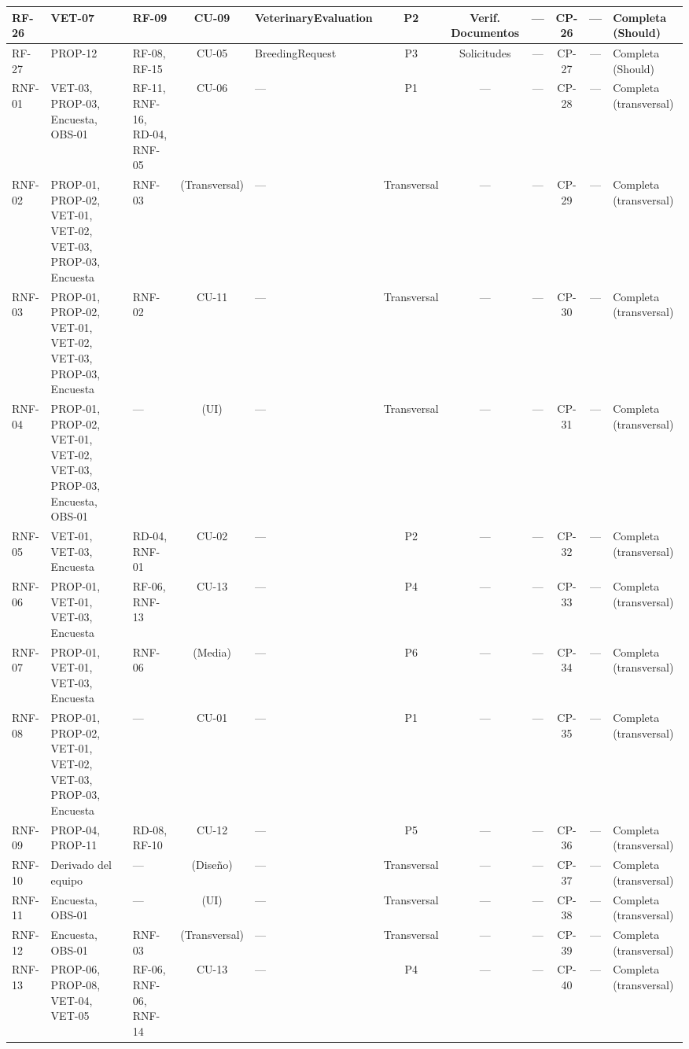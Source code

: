 \documentclass[journal,onecolumn]{IEEEtran}
\begin{document}
\begin{landscape}
\begin{table}[H]
\begin{tabularx}{\linewidth}{|l|X|X|c|X|c|c|c|c|c|X|}
				RF-26 & VET-07 & RF-09 & CU-09 & VeterinaryEvaluation & P2 & Verif. Documentos & --- & CP-26 & --- & Completa (Should) \\ \hline
				RF-27 & PROP-12 & RF-08, RF-15 & CU-05 & BreedingRequest & P3 & Solicitudes & --- & CP-27 & --- & Completa (Should) \\ \hline
				RNF-01 & VET-03, PROP-03, Encuesta, OBS-01 & RF-11, RNF-16, RD-04, RNF-05 & CU-06 & --- & P1 & --- & --- & CP-28 & --- & Completa (transversal) \\ \hline
				RNF-02 & PROP-01, PROP-02, VET-01, VET-02, VET-03, PROP-03, Encuesta & RNF-03 & (Transversal) & --- & Transversal & --- & --- & CP-29 & --- & Completa (transversal) \\ \hline
				RNF-03 & PROP-01, PROP-02, VET-01, VET-02, VET-03, PROP-03, Encuesta & RNF-02 & CU-11 & --- & Transversal & --- & --- & CP-30 & --- & Completa (transversal) \\ \hline
				RNF-04 & PROP-01, PROP-02, VET-01, VET-02, VET-03, PROP-03, Encuesta, OBS-01 & --- & (UI) & --- & Transversal & --- & --- & CP-31 & --- & Completa (transversal) \\ \hline
				RNF-05 & VET-01, VET-03, Encuesta & RD-04, RNF-01 & CU-02 & --- & P2 & --- & --- & CP-32 & --- & Completa (transversal) \\ \hline
				RNF-06 & PROP-01, VET-01, VET-03, Encuesta & RF-06, RNF-13 & CU-13 & --- & P4 & --- & --- & CP-33 & --- & Completa (transversal) \\ \hline
				RNF-07 & PROP-01, VET-01, VET-03, Encuesta & RNF-06 & (Media) & --- & P6 & --- & --- & CP-34 & --- & Completa (transversal) \\ \hline
				RNF-08 & PROP-01, PROP-02, VET-01, VET-02, VET-03, PROP-03, Encuesta & --- & CU-01 & --- & P1 & --- & --- & CP-35 & --- & Completa (transversal) \\ \hline
				RNF-09 & PROP-04, PROP-11 & RD-08, RF-10 & CU-12 & --- & P5 & --- & --- & CP-36 & --- & Completa (transversal) \\ \hline
				RNF-10 & Derivado del equipo & --- & (Diseño) & --- & Transversal & --- & --- & CP-37 & --- & Completa (transversal) \\ \hline
				RNF-11 & Encuesta, OBS-01 & --- & (UI) & --- & Transversal & --- & --- & CP-38 & --- & Completa (transversal) \\ \hline
				RNF-12 & Encuesta, OBS-01 & RNF-03 & (Transversal) & --- & Transversal & --- & --- & CP-39 & --- & Completa (transversal) \\ \hline
				RNF-13 & PROP-06, PROP-08, VET-04, VET-05 & RF-06, RNF-06, RNF-14 & CU-13 & --- & P4 & --- & --- & CP-40 & --- & Completa (transversal) \\ \hline

\end{tabularx}
\end{table}
\end{landscape}
\end{document}
